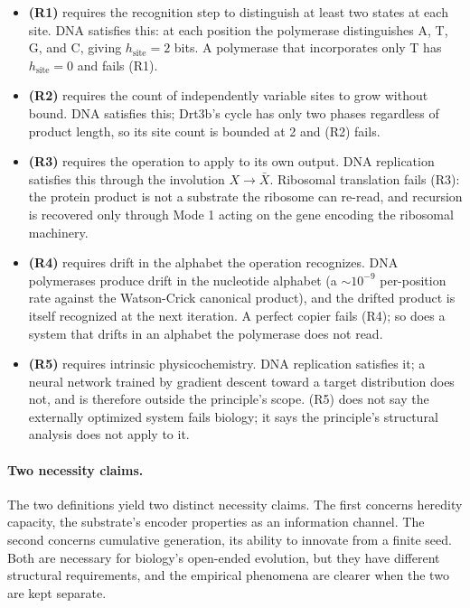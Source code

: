 \documentclass[aps,prx,reprint,amsmath,amssymb,floatfix,superscriptaddress,nofootinbib]{revtex4-2}
\theoremstyle{plain-thm}
\theoremstyle{definition-thm}
\begin{document}
\begin{itemize}
\item \textbf{(R1)} requires the recognition step to distinguish at least two states at each site. DNA satisfies this: at each position the polymerase distinguishes A, T, G, and C, giving $h_{\mathrm{site}} = 2$ bits. A polymerase that incorporates only T has $h_{\mathrm{site}} = 0$ and fails (R1).
\item \textbf{(R2)} requires the count of independently variable sites to grow without bound. DNA satisfies this; Drt3b's cycle has only two phases regardless of product length, so its site count is bounded at 2 and (R2) fails.
\item \textbf{(R3)} requires the operation to apply to its own output. DNA replication satisfies this through the involution $X \to \bar{X}$. Ribosomal translation fails (R3): the protein product is not a substrate the ribosome can re-read, and recursion is recovered only through Mode 1 acting on the gene encoding the ribosomal machinery.
\item \textbf{(R4)} requires drift in the alphabet the operation recognizes. DNA polymerases produce drift in the nucleotide alphabet (a $\sim 10^{-9}$ per-position rate against the Watson-Crick canonical product), and the drifted product is itself recognized at the next iteration. A perfect copier fails (R4); so does a system that drifts in an alphabet the polymerase does not read.
\item \textbf{(R5)} requires intrinsic physicochemistry. DNA replication satisfies it; a neural network trained by gradient descent toward a target distribution does not, and is therefore outside the principle's scope. (R5) does not say the externally optimized system fails biology; it says the principle's structural analysis does not apply to it.
\end{itemize}

\paragraph{Two necessity claims.}

The two definitions yield two distinct necessity claims. The first concerns heredity capacity, the substrate's encoder properties as an information channel. The second concerns cumulative generation, its ability to innovate from a finite seed. Both are necessary for biology's open-ended evolution, but they have different structural requirements, and the empirical phenomena are clearer when the two are kept separate.
\end{document}
